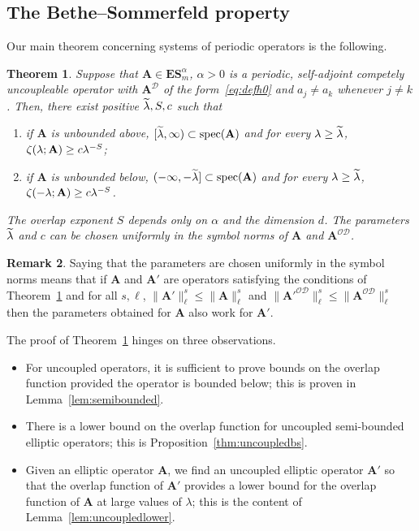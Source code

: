 \documentclass[10pt]{amsart}
\newtheorem{theo}{Theorem}[section]
\theoremstyle{definition}\newtheorem{defi}[theo]{Definition}\newtheorem{rema}[theo]{Remark}\newtheorem{exam}[theo]{Example}\newtheorem{nota}[theo]{Notation}
\DeclareMathOperator{\spec}{spec}
\newcommand{\CD}{\mathcal{D}}
\newcommand{\CO}{\mathcal{O}}
\newcommand{\BA}{\mathbf A}
\newcommand{\BE}{\mathbf E}
\newcommand{\BS}{\mathbf S}
\newcommand{\mpu}{competely uncoupleable}
\let\oldtilde\tilde
\renewcommand*{\tilde}[1]{\mathchoice{\widetilde{#1}}{\widetilde{#1}}{\oldtilde{#1}}{\oldtilde{#1}}}
\begin{document}
\subsection{The Bethe--Sommerfeld property} Our main theorem concerning systems of periodic operators is the following.
\begin{theo} \label{thm:bs}
Suppose that $\BA \in \BE\BS^\alpha_m$, $\alpha > 0$ is a periodic, self-adjoint
\mpu{} operator with $\BA^\CD$ of the form~\eqref{eq:defh0} and $a_j \ne a_k$ whenever $j \ne k$. Then, there exist positive $\tilde \lambda, S,c$ such that
\begin{enumerate}
\item \label{it:bspos}
if $\BA$ is unbounded above, $[\tilde \lambda,\infty) \subset
\spec(\BA)$ and for every $\lambda \ge \tilde \lambda$, $\zeta(\lambda;\BA)\linebreak \ge c
\lambda^{-S}$;
\item \label{it:bsneg}
if $\BA$ is unbounded below, $(- \infty,-\tilde \lambda] \subset
\spec(\BA)$ and for every $\lambda \ge \tilde \lambda$, $\zeta(-\lambda;\BA) \linebreak\ge c
\lambda^{-S}$.
\end{enumerate}
The overlap exponent $S$ depends only on $\alpha$ and the dimension $d$. The parameters $\tilde \lambda$ and $c$ can be chosen uniformly in the symbol norms of $\BA$ and $\BA^{\CO\CD}$.
\end{theo}

\begin{rema}
Saying that the parameters are chosen uniformly in the symbol norms means that if $\BA$ and $\BA'$ are operators satisfying the conditions of Theorem~\ref{thm:bs} and for all $s,\ell$, $\|\BA'\|^{s}_{\ell} \le \|\BA\|^{s}_{\ell}$ and $\|\BA'^{\CO\CD}\|^{s}_{\ell} \le \|\BA^{\CO\CD}\|^{s}_{\ell}$ then the parameters obtained for $\BA$ also work for $\BA'$.
\end{rema}


The proof of Theorem~\ref{thm:bs} hinges on three observations.
\begin{itemize}
\item For uncoupled operators, it is sufficient to prove bounds on the overlap function provided the operator is bounded below; this is proven in Lemma~\ref{lem:semibounded}.
\item There is a lower bound on the overlap function for uncoupled semi-bounded elliptic operators; this is Proposition~\ref{thm:uncoupledbs}.
\item Given an elliptic operator $\BA$, we find an uncoupled elliptic operator $\BA'$ so that the overlap function of $\BA'$ provides a lower bound for the overlap function of $\BA$ at large values of $\lambda$; this is the content of Lemma~\ref{lem:uncoupledlower}.
\end{itemize}
\end{document}
